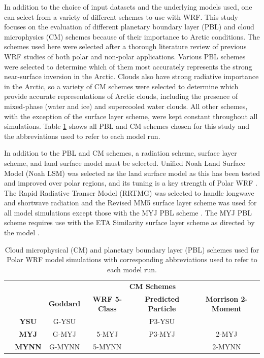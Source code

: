 In addition to the choice of input datasets and the underlying models used, one can select from a variety of different schemes to use with WRF. This study focuses on the evaluation of different planetary boundary layer (PBL) and cloud microphysics (CM) schemes because of their importance to Arctic conditions. The schemes used here were selected after a thorough literature review of previous WRF studies of both polar and non-polar applications. Various PBL schemes were selected to determine which of them most accurately represents the strong near-surface inversion in the Arctic. Clouds also have strong radiative importance in the Arctic, so a variety of CM schemes were selected to determine which provide accurate representations of Arctic clouds, including the presence of mixed-phase (water and ice) and supercooled water clouds. All other schemes, with the exception of the surface layer scheme, were kept constant throughout all simulations. Table \ref{tab:schemes} shows all PBL and CM schemes chosen for this study and the abbreviations used to refer to each model run. 

In addition to the PBL and CM schemes, a radiation scheme, surface layer scheme, and land surface model must be selected.  Unified Noah Land Surface Model (Noah LSM) was selected as the land surface model as this has been tested and improved over polar regions, and its tuning is a key strength of Polar WRF \citep{mukul:2004, hines:2015}. The Rapid Radiative Transer Model (RRTMG) was selected to handle longwave and shortwave radiation \cite{mlawer:1997} and the Revised MM5 surface layer scheme was used for all model simulations except those with the MYJ PBL scheme \citep{jimenez:2012}. The MYJ PBL scheme requires use with the ETA Similarity surface layer scheme as directed by the model \citep{janjic:2001}. 

\begin{table}[H]
\centering
\footnotesize
{\begin{tabular}{| c | c | c | c | c | c |}
  \hline
 \rowcolor[HTML]{F3F3F3} & & \multicolumn{4}{c|}{\textbf{CM Schemes}} \\
 \rowcolor[HTML]{F3F3F3} & & \textbf{Goddard} & \textbf{WRF 5-Class} & \textbf{Predicted Particle} & \textbf{Morrison 2-Moment} \\
  \hline
\cellcolor[HTML]{F3F3F3}
 &\textbf{YSU} & G-YSU & & P3-YSU & \\
\cellcolor[HTML]{F3F3F3}  & \textbf{MYJ} & G-MYJ & 5-MYJ & P3-MYJ & 2-MYJ \\ 
\cellcolor[HTML]{F3F3F3}  \parbox[t]{3mm}{} \parbox[t]{2mm}{} & \textbf{MYNN} & G-MYNN & 5-MYNN & & 2-MYNN \\
  \hline
\end{tabular}}
\caption{Cloud microphysical (CM) and planetary boundary layer (PBL) schemes used for Polar WRF model simulations with corresponding abbreviations used to refer to each model run.}
\label{tab:schemes}
\end{table}

